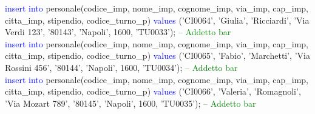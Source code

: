 \documentclass{article}
\begin{document}
\begin{flushleft}
{        \vspace{2mm}
        \hspace*{0.5em}\textcolor{blue}{insert into} personale(codice\_imp, nome\_imp, cognome\_imp, via\_imp, cap\_imp, \hspace*{0.5em}citta\_imp, stipendio, codice\_turno\_p) \textcolor{blue}{values} ('CI0064', 'Giulia', 'Ricciardi', \hspace*{0.5em}'Via Verdi 123', \hspace*{0.5em}'80143', 'Napoli', 1600, 'TU0033'); \hspace*{0.5em} \textcolor{green}{-- Addetto bar} \\
        \newpage
        \hspace*{0.5em}\textcolor{blue}{insert into} personale(codice\_imp, nome\_imp, cognome\_imp, via\_imp, cap\_imp, \hspace*{0.5em}citta\_imp, stipendio, codice\_turno\_p) \textcolor{blue}{values} ('CI0065', 'Fabio', 'Marchetti', \hspace*{0.5em}'Via Rossini 456', \hspace*{0.5em}'80144', 'Napoli', 1600, 'TU0034'); \hspace*{0.5em} \textcolor{green}{-- Addetto bar} \\
        \vspace{2mm}
        \hspace*{0.5em}\textcolor{blue}{insert into} personale(codice\_imp, nome\_imp, cognome\_imp, via\_imp, cap\_imp, \hspace*{0.5em}citta\_imp, stipendio, codice\_turno\_p) \textcolor{blue}{values} ('CI0066', 'Valeria', 'Romagnoli', \hspace*{0.5em}'Via Mozart \hspace*{0.5em}789', '80145', 'Napoli', 1600, 'TU0035'); \hspace*{0.5em} \textcolor{green}{-- Addetto bar} \\
        }
    \end{flushleft}
\end{document}
